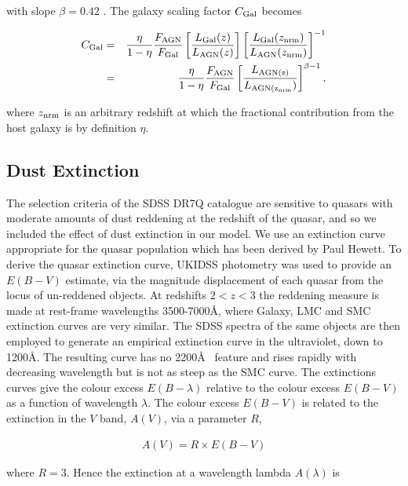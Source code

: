 with slope $\beta=0.42$ \citep{maddox06}. 
The galaxy scaling factor $C_{\rm Gal}$ becomes 

\begin{eqnarray}
  C_{\rm Gal} &=& \frac{\eta}{1 - \eta} \frac{F_{\rm AGN}}{F_{\rm Gal}} \left[ \frac{ L_{\rm Gal}(z)} {L_{\rm AGN}(z)} \right] \left[ \frac{ L_{\rm Gal}(z_{\rm nrm})} {L_{\rm AGN}(z_{\rm nrm})} \right]^{-1} \\
  &=& \frac{\eta}{1 - \eta} \frac{F_{\rm AGN}}{F_{\rm Gal}} \left[ \frac{L_{\rm AGN(z)}} {L_{\rm AGN(z_{\rm nrm}})} \right]^{\beta -1}, 
\end{eqnarray}

where $z_{\rm nrm}$ is an arbitrary redshift at which the fractional contribution from the host galaxy is by definition $\eta$. 

\subsection{Dust Extinction}
\label{sec:sed-extinction} 

The selection criteria of the SDSS DR7Q catalogue are sensitive to quasars with moderate amounts of dust reddening \citep[possibly as high as $E(B-V)$ $\sim$ 0.5;][]{richards03} at the redshift of the quasar, and so we included the effect of dust extinction in our model. 
We use an extinction curve appropriate for the quasar population which has been derived by Paul Hewett. 
To derive the quasar extinction curve, UKIDSS photometry was used to provide an $E(B-V)$ estimate, via the magnitude displacement of each quasar from the locus of un-reddened objects. 
At redshifts $2 < z < 3$ the reddening measure is made at rest-frame wavelengths 3500-7000\AA, where Galaxy, LMC and SMC extinction curves are very similar. 
The SDSS spectra of the same objects are then employed to generate an empirical extinction curve in the ultraviolet, down to 1200\AA. 
The resulting curve has no 2200\AA~ feature and rises rapidly with decreasing wavelength but is not as steep as the SMC curve. 
The extinctions curves give the colour excess $E(B-\lambda)$ relative to the colour excess $E(B-V)$ as a function of wavelength $\lambda$. 
The colour excess $E(B-V)$ is related to the extinction in the $V$ band, $A(V)$, via a parameter $R$, 

\begin{eqnarray}
  A(V) = R \times E(B -V )
\end{eqnarray}

where $R = 3$. 
Hence the extinction at a wavelength lambda $A(\lambda)$ is 

